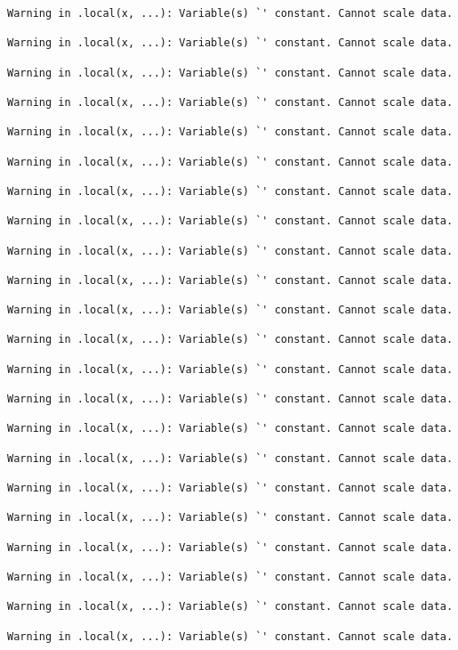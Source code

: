 \documentclass[
  letterpaper,
  DIV=11,
  numbers=noendperiod]{scrartcl}
\begin{document}
\begin{verbatim}
Warning in .local(x, ...): Variable(s) `' constant. Cannot scale data.

Warning in .local(x, ...): Variable(s) `' constant. Cannot scale data.

Warning in .local(x, ...): Variable(s) `' constant. Cannot scale data.

Warning in .local(x, ...): Variable(s) `' constant. Cannot scale data.

Warning in .local(x, ...): Variable(s) `' constant. Cannot scale data.

Warning in .local(x, ...): Variable(s) `' constant. Cannot scale data.

Warning in .local(x, ...): Variable(s) `' constant. Cannot scale data.

Warning in .local(x, ...): Variable(s) `' constant. Cannot scale data.

Warning in .local(x, ...): Variable(s) `' constant. Cannot scale data.

Warning in .local(x, ...): Variable(s) `' constant. Cannot scale data.

Warning in .local(x, ...): Variable(s) `' constant. Cannot scale data.

Warning in .local(x, ...): Variable(s) `' constant. Cannot scale data.

Warning in .local(x, ...): Variable(s) `' constant. Cannot scale data.

Warning in .local(x, ...): Variable(s) `' constant. Cannot scale data.

Warning in .local(x, ...): Variable(s) `' constant. Cannot scale data.

Warning in .local(x, ...): Variable(s) `' constant. Cannot scale data.

Warning in .local(x, ...): Variable(s) `' constant. Cannot scale data.

Warning in .local(x, ...): Variable(s) `' constant. Cannot scale data.

Warning in .local(x, ...): Variable(s) `' constant. Cannot scale data.

Warning in .local(x, ...): Variable(s) `' constant. Cannot scale data.

Warning in .local(x, ...): Variable(s) `' constant. Cannot scale data.

Warning in .local(x, ...): Variable(s) `' constant. Cannot scale data.
\end{verbatim}
\end{document}
